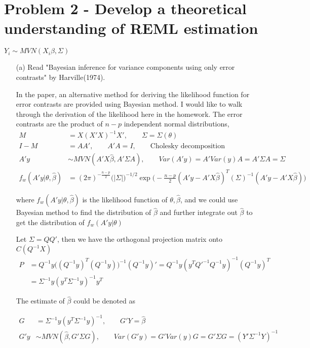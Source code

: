 \section{Problem 2 - Develop a theoretical understanding of REML estimation}

$Y_i \sim MVN(X_i \beta, \Sigma)$

\begin{itemize}
\item[(a)] Read "Bayesian inference for variance components using only error contrasts" by Harville(1974). 

In the paper, an alternative method for deriving the likelihood function for error contrasts are provided using Bayesian method. I would like to walk through the derivation of the likelihood here in the homework.
The error contrasts are the product of $n-p$ independent normal distributions, 
 \begin{align*}
    M &= X(X'X)^{-1}X', \qquad \Sigma = \Sigma(\theta) \\
    I - M &= A A', \qquad A'A = I, \qquad \text{Cholesky decomposition} \\
    A' y & \sim MVN( A' X \hat{\beta}, A' \Sigma A) , \qquad Var(A'y) = A' Var(y) A = A' \Sigma A = \Sigma\\
    f_w(A' y| \theta, \hat{\beta}) &= ( 2\pi )^{- \frac{n-p}{2}} \Big( |\Sigma | \Big)^{-1/2} \exp \Big( -\frac{n-p}{2} (A'y - A' X \hat{\beta})^T (\Sigma)^{-1} (A'y - A' X \hat{\beta}) \Big)
\end{align*}

where $f_w(A' y| \theta, \hat{\beta})$ is the likelihood function of $\theta, \hat{\beta}$, and we could use Bayesian method to find the distribution of $\hat{\beta}$ and further integrate out $\hat{\beta}$ to get the distribution of $f_w(A' y| \theta)$ 

Let $\Sigma = Q Q'$, then we have the orthogonal projection matrix onto $C(Q^{-1}X)$
 \begin{align*}
P &= Q^{-1}y \Big( (Q^{-1} y)^T (Q^{-1} y) \Big)^{-1} (Q^{-1} y)'  = Q^{-1} y (y^T Q'^{-1} Q^{-1} y)^{-1} (Q^{-1}y)^T \\
&= \Sigma^{-1} y (y^T \Sigma^{-1} y)^{-1} y^T
\end{align*}

The estimate of $\hat{\beta}$ could be denoted as 

 \begin{align*}
G &= \Sigma^{-1} y (y^T \Sigma^{-1} y)^{-1} , \qquad G'Y = \hat{\beta}\\
 G' y & \sim MVN( \hat{\beta}, G' \Sigma G) , \qquad Var(G'y) = G' Var(y) G = G' \Sigma G = (Y' \Sigma^{-1} Y)^{-1} 
\end{align*}


\end{itemize}
